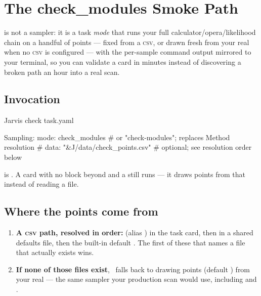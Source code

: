 \chapter{The check\_modules Smoke Path}
\label{ch:check-modules}

  is not a
sampler: it is a task \emph{mode} that runs your full calculator/opera/likelihood chain
on a handful of points --- fixed from a \textsc{csv}, or drawn fresh from your real
 when no \textsc{csv} is configured --- with the per-sample
command output mirrored to your terminal, so you can validate a card in minutes instead
of discovering a broken  path an hour into a real scan.

\section{Invocation}
\label{sec:check-invocation}

\begin{terminal}
\begin{jcmd}
Jarvis check task.yaml
\end{jcmd}
\end{terminal}

\begin{yamlwin}
Sampling:
  mode: check_modules              # or "check-modules"; replaces Method resolution
  # data: "&J/data/check_points.csv"   # optional; see resolution order below
\end{yamlwin}

 is \opt. A card with no  block beyond  and
a  still runs --- it draws points from that  instead of
reading a file.

\section{Where the points come from}
\label{sec:check-points-source}

\begin{enumerate}
  \item \textbf{A \textsc{csv} path, resolved in order:}
         (alias ) in the task card, then
         in a shared defaults file, then the
        built-in default . The first of
        these that names a file that actually exists wins.
  \item \textbf{If none of those files exist}, \Jtwo\ falls back to drawing
         points (default ) from
        your real  --- the same sampler your production scan
        would use, including  and .
\end{enumerate}


